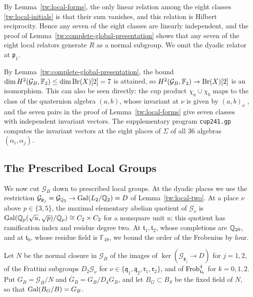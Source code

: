 By Lemma~\ref{tw:local-forms}, the only linear relation among the eight
classes \eqref{tw:local-initials} is that their sum vanishes, and this
relation is Hilbert reciprocity. Hence any seven of the eight classes are
linearly independent, and the proof of
Lemma~\ref{tw:complete-global-presentation} shows that any seven of the eight
local relators generate $R$ as a normal subgroup. We omit the dyadic relator
at $\mathfrak p_1$.

\begin{remark}\label{tw:cup-remark}
By Lemma~\ref{tw:complete-global-presentation}, the bound
$\dim H^2(\mathcal G_B,\mathbb F_2)\le\dim\operatorname{Br}(X)[2]=7$ is attained, so
$H^2(\mathcal G_B,\mathbb F_2)\to\operatorname{Br}(X)[2]$ is an isomorphism. This can also be seen
directly: the cup product
$\chi_a\cup\chi_b$ maps to the class of the quaternion algebra $(a,b)$, whose
invariant at $\nu$ is given by $(a,b)_\nu$ \cite[Chapter~III,
Remark~4.7]{MilneCFT}, and the seven pairs in the proof of
Lemma~\ref{tw:local-forms} give seven classes with independent invariant
vectors. The supplementary program \texttt{cup241.gp} computes the invariant
vectors at the eight places of $\Sigma$ of all $36$ algebras
$(\alpha_i,\alpha_j)$.
\end{remark}

\subsection{The Prescribed Local Groups}\label{tw:prescribed-section}
We now cut $\mathcal G_B$ down to prescribed local groups. At the dyadic
places we use the restriction
$\mathcal G_{\mathfrak p_j}=\mathcal G_{\mathbb Q_2}\to\operatorname{Gal}(L_2/\mathbb Q_2)=D$ of
Lemma~\ref{tw:local-two}. At a place $\nu$ above $p\in\{3,5\}$, the maximal
elementary abelian quotient of $\mathcal G_\nu$ is
$\operatorname{Gal}(\mathbb Q_p(\sqrt u,\sqrt p)/\mathbb Q_p)\cong C_2\times C_2$ for a nonsquare unit $u$;
this quotient has ramification index and residue degree two. At
$\mathfrak t_1,\mathfrak t_2$, whose completions are $\mathbb Q_{29}$, and at
$\mathfrak t_0$, whose residue field is $\mathbb F_{49}$, we bound the order
of the Frobenius by four.

\begin{definition}\label{tw:GB}
Let $N$ be the normal closure in $\mathcal G_B$ of the images of
$\ker(\mathcal G_{\mathfrak p_j}\to D)$ for $j=1,2$, of the Frattini subgroups
$D_2\mathcal G_\nu$ for $\nu\in\{\mathfrak q_1,\mathfrak q_2,\mathfrak r_1,\mathfrak r_2\}$,
and of $\operatorname{Frob}_{\mathfrak t_k}^4$ for $k=0,1,2$. Put $G_B=\mathcal G_B/N$ and
$\overline G_B=G_B/D_4G_B$, and let $B_G\subset B_S$ be the fixed field of
$N$, so that $\operatorname{Gal}(B_G/B)=G_B$.
\end{definition}

